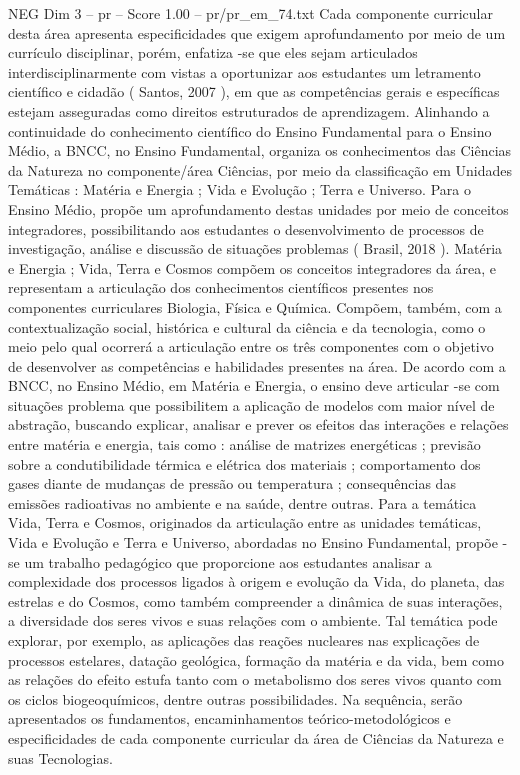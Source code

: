 \begin{textsample}{NEG Dim 3 – pr – Score 1.00 – pr/pr\_em\_74.txt}
Cada componente curricular desta área apresenta especificidades que exigem aprofundamento por meio de um currículo disciplinar, porém, enfatiza -se que eles sejam articulados interdisciplinarmente com vistas a oportunizar aos estudantes um letramento científico e cidadão ( Santos, 2007 ), em que as competências gerais e específicas estejam asseguradas como direitos estruturados de aprendizagem.
Alinhando a continuidade do conhecimento científico do Ensino Fundamental para o Ensino Médio, a BNCC, no Ensino Fundamental, organiza os conhecimentos das Ciências da Natureza no componente/área Ciências, por meio da classificação em Unidades Temáticas : Matéria e Energia ; Vida e Evolução ; Terra e Universo.
Para o Ensino Médio, propõe um aprofundamento destas unidades por meio de conceitos integradores, possibilitando aos estudantes o desenvolvimento de processos de investigação, análise e discussão de situações problemas ( Brasil, 2018 ).
Matéria e Energia ; Vida, Terra e Cosmos compõem os conceitos integradores da área, e representam a articulação dos conhecimentos científicos presentes nos componentes curriculares Biologia, Física e Química.
Compõem, também, com a contextualização social, histórica e cultural da ciência e da tecnologia, como o meio pelo qual ocorrerá a articulação entre os três componentes com o objetivo de desenvolver as competências e habilidades presentes na área.
De acordo com a BNCC, no Ensino Médio, em Matéria e Energia, o ensino deve articular -se com situações problema que possibilitem a aplicação de modelos com maior nível de abstração, buscando explicar, analisar e prever os efeitos das interações e relações entre matéria e energia, tais como : análise de matrizes energéticas ; previsão sobre a condutibilidade térmica e elétrica dos materiais ; comportamento dos gases diante de mudanças de pressão ou temperatura ; consequências das emissões radioativas no ambiente e na saúde, dentre outras.
Para a temática Vida, Terra e Cosmos, originados da articulação entre as unidades temáticas, Vida e Evolução e Terra e Universo, abordadas no Ensino Fundamental, propõe -se um trabalho pedagógico que proporcione aos estudantes analisar a complexidade dos processos ligados à origem e evolução da Vida, do planeta, das estrelas e do Cosmos, como também compreender a dinâmica de suas interações, a diversidade dos seres vivos e suas relações com o ambiente.
Tal temática pode explorar, por exemplo, as aplicações das reações nucleares nas explicações de processos estelares, datação geológica, formação da matéria e da vida, bem como as relações do efeito estufa tanto com o metabolismo dos seres vivos quanto com os ciclos biogeoquímicos, dentre outras possibilidades.
Na sequência, serão apresentados os fundamentos, encaminhamentos teórico-metodológicos e especificidades de cada componente curricular da área de Ciências da Natureza e suas Tecnologias.

\end{textsample}
